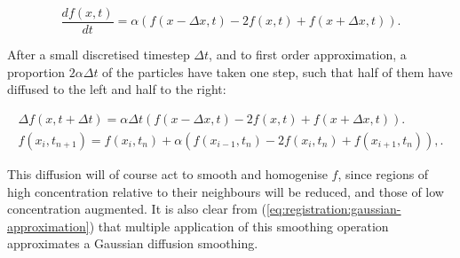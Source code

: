     \begin{equation}
	    \frac{d f(x, t)}{d t} = \alpha (f(x - \Delta x, t) - 2f(x, t) + f(x + \Delta x, t)).
    \end{equation}
    
    After a small discretised timestep $\Delta t$, and to first order approximation, a proportion $2\alpha \Delta t$ of the particles have taken one step, such that half of them have diffused to the left and half to the right:
  	
	  \begin{gather}
	    \Delta f(x, t + \Delta t) = \alpha \Delta t(f(x - \Delta x, t) - 2f(x, t) + f(x + \Delta x, t)). \\
	    f(x_i, t_{n+1}) = f(x_i, t_n) + \alpha (f(x_{i-1}, t_n) - 2f(x_i, t_n) + f(x_{i+1}, t_n)), \label{eqn:diffusion_1d}.
		\end{gather}
  	
	  This diffusion will of course act to smooth and homogenise $f$, since regions of high concentration relative to their neighbours will be reduced, and those of low concentration augmented. It is also clear from (\ref{eq:registration:gaussian-approximation}) that multiple application of this smoothing operation approximates a Gaussian diffusion smoothing.
		
	
